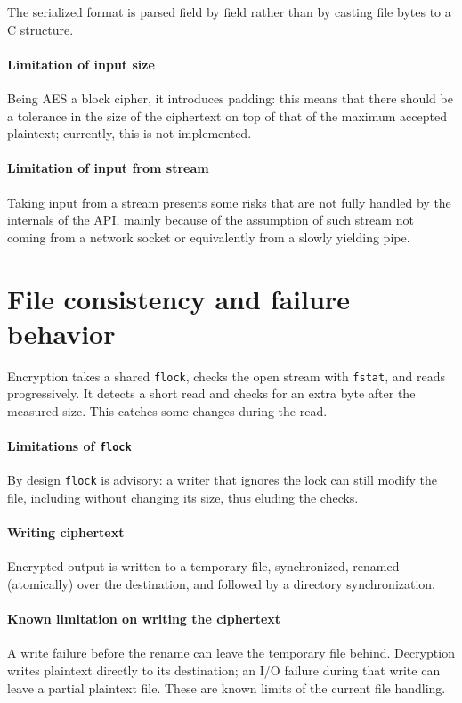 The serialized format is parsed field by field rather than by casting file
bytes to a C structure.

\paragraph{Limitation of input size}
Being AES a block cipher, it introduces padding: this means that there should
be a tolerance in the size of the ciphertext on top of that of the maximum accepted
plaintext; currently, this is not implemented.

\paragraph{Limitation of input from stream}
Taking input from a stream presents some risks that are not fully handled by
the internals of the API, mainly because of the assumption of such stream not
coming from a network socket or equivalently from a slowly yielding pipe.

\section{File consistency and failure behavior}

Encryption takes a shared \texttt{flock}, checks the open stream with
\texttt{fstat}, and reads progressively. It detects a short read and checks
for an extra byte after the measured size. This catches some changes during
the read.

\paragraph{Limitations of \texttt{flock}}
By design \texttt{flock} is advisory: a writer that ignores the lock can
still modify the file, including without changing its size, thus eluding the checks.

\paragraph{Writing ciphertext}
Encrypted output is written to a temporary file, synchronized, renamed (atomically)
over the destination, and followed by a directory synchronization.

\paragraph{Known limitation on writing the ciphertext}
A write failure before the rename can leave the
temporary file behind. Decryption writes
plaintext directly to its destination; an I/O failure during that write can
leave a partial plaintext file. These are known limits of the current file
handling.

